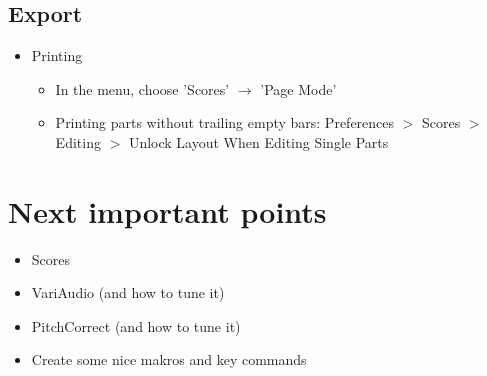 \documentclass[10pt]{article}
\begin{document}
\subsection{Export}

\begin{itemize}
	\item Printing
	\begin{itemize}
		\item In the menu, choose 'Scores' $\rightarrow$ 'Page Mode'
		\item Printing parts without trailing empty bars: Preferences $>$ Scores $>$ Editing $>$ Unlock Layout When Editing Single Parts
	\end{itemize}
\end{itemize}


\section{Next important points}

\begin{itemize}
	\item Scores
	\item VariAudio (and how to tune it)
	\item PitchCorrect (and how to tune it)
	\item Create some nice makros and key commands
\end{itemize}
\end{document}
